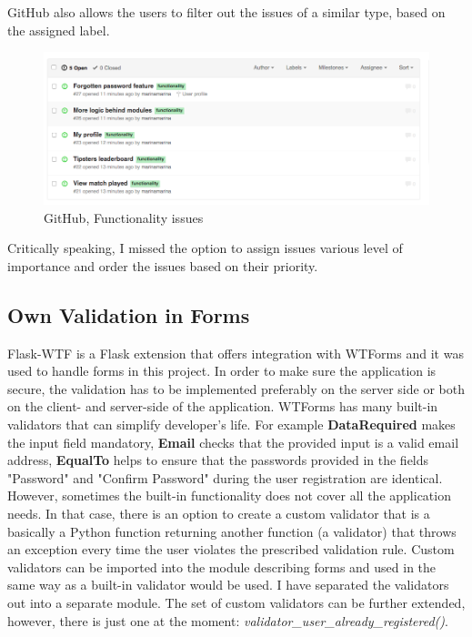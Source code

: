 GitHub also allows the users to filter out the issues of a similar type, based on the assigned label.

\begin{figure}[H]
	\begin{center}
		\includegraphics[width=.90\linewidth,natwidth=610,natheight=642]{impl/images/githubFunctionalityIssues}
		\caption{GitHub, Functionality issues} \label{fig:using:githubFunctionalityIssues}
	\end{center}
\end{figure}

Critically speaking, I missed the option to assign issues various level of importance and order the issues based on their priority.

\subsection{Own Validation in Forms}
Flask-WTF is a Flask extension that offers integration with WTForms and it was used to handle forms in this project. In order to make sure the application is secure, the validation has to be implemented preferably on the server side or both on the client- and server-side of the application. WTForms has many built-in validators that can simplify developer's life. For example \textbf{DataRequired} makes the input field mandatory, \textbf{Email} checks that the provided input is a valid email address, \textbf{EqualTo} helps to ensure that the passwords provided in the fields "Password" and "Confirm Password" during the user registration are identical. However, sometimes the built-in functionality does not cover all the application needs. In that case, there is an option to create a custom validator that is a basically a Python function returning another function (a validator) that throws an exception every time the user violates the prescribed validation rule. Custom validators can be imported into the module describing forms and used in the same way as a built-in validator would be used. I have separated the validators out into a separate module. The set of custom validators can be further extended, however, there is just one at the moment: \emph{validator\_user\_already\_registered()}. 

